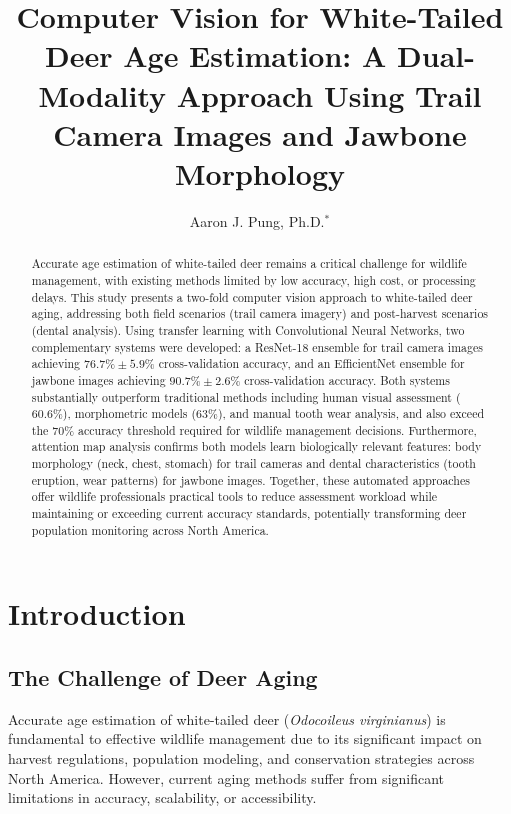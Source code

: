 \documentclass{iopjournal}
\begin{document}

\title{Computer Vision for White-Tailed Deer Age Estimation: A Dual-Modality Approach Using Trail Camera Images and Jawbone Morphology}

\author{Aaron J. Pung, Ph.D.$^{*}$}



\begin{abstract}
Accurate age estimation of white-tailed deer remains a critical challenge for wildlife management, with existing methods limited by low accuracy, high cost, or processing delays. This study presents a two-fold computer vision approach to white-tailed deer aging, addressing both field scenarios (trail camera imagery) and post-harvest scenarios (dental analysis). Using transfer learning with Convolutional Neural Networks, two complementary systems were developed: a ResNet-18 ensemble for trail camera images achieving $76.7\% \pm 5.9\%$ cross-validation accuracy, and an EfficientNet ensemble for jawbone images achieving $90.7\% \pm 2.6\%$ cross-validation accuracy. Both systems substantially outperform traditional methods including human visual assessment ($60.6\%$), morphometric models ($63\%$), and manual tooth wear analysis, and also exceed the $70\%$ accuracy threshold required for wildlife management decisions. Furthermore, attention map analysis confirms both models learn biologically relevant features: body morphology (neck, chest, stomach) for trail cameras and dental characteristics (tooth eruption, wear patterns) for jawbone images. Together, these automated approaches offer wildlife professionals practical tools to reduce assessment workload while maintaining or exceeding current accuracy standards, potentially transforming deer population monitoring across North America.
\end{abstract}

\section{Introduction}
\subsection{The Challenge of Deer Aging}
Accurate age estimation of white-tailed deer (\textit{Odocoileus virginianus}) is fundamental to effective wildlife management due to its significant impact on harvest regulations, population modeling, and conservation strategies across North America. However, current aging methods suffer from significant limitations in accuracy, scalability, or accessibility.
\end{document}
